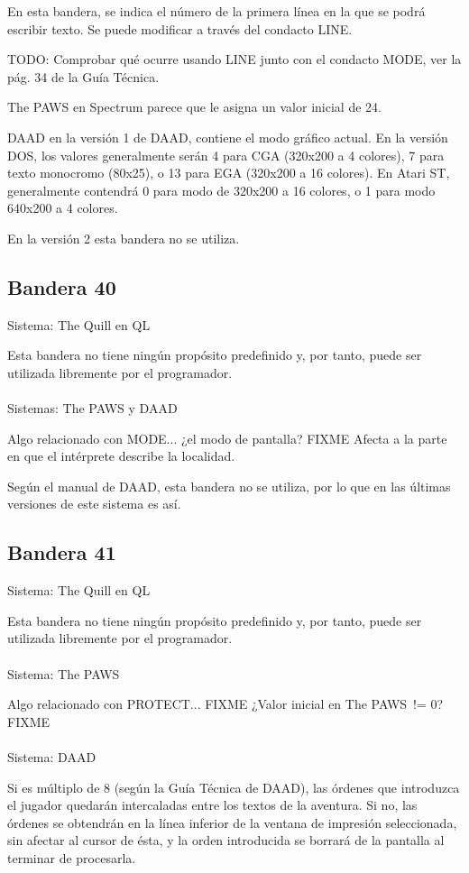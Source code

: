 \documentclass[11pt, a5paper]{article}
\newcommand{\quill}{\textsf{The Quill}\xspace}
\newcommand{\paw}{\textsf{The PAWS}\xspace}
\newcommand{\daad}{\textsf{DAAD}\xspace}
\newcommand{\sistema}[1]{\noindent Sistema: #1 \nopagebreak}
\newcommand{\sistemas}[1]{\noindent Sistemas: #1 \nopagebreak}
\begin{document}
En esta bandera, se indica el número de la primera línea en la que se podrá escribir texto. Se puede modificar a través del condacto LINE.

TODO: Comprobar qué ocurre usando LINE junto con el condacto MODE, ver la pág. 34 de la Guía Técnica.

\paw en Spectrum parece que le asigna un valor inicial de 24.

\daad en la versión 1 de \daad, contiene el modo gráfico actual. En la versión DOS, los valores generalmente serán 4 para CGA (320x200 a 4 colores), 7 para texto monocromo (80x25), o 13 para EGA (320x200 a 16 colores). En Atari ST, generalmente contendrá 0 para modo de 320x200 a 16 colores, o 1 para modo 640x200 a 4 colores.

En la versión 2 esta bandera no se utiliza.

\subsection{Bandera 40}

\sistema{\quill en QL}

Esta bandera no tiene ningún propósito predefinido y, por tanto, puede ser utilizada libremente por el programador.
\\\ \\
\sistemas{\paw y \daad}

Algo relacionado con MODE... ¿el modo de pantalla? FIXME
Afecta a la parte en que el intérprete describe la localidad.

Según el manual de \daad, esta bandera no se utiliza, por lo que en las últimas versiones de este sistema es así.

\subsection{Bandera 41}

\sistema{\quill en QL}

Esta bandera no tiene ningún propósito predefinido y, por tanto, puede ser utilizada libremente por el programador.
\\\ \\
\sistema{\paw}

Algo relacionado con PROTECT... FIXME
¿Valor inicial en \paw\ != 0? FIXME
\\\ \\
\sistema{\daad}

Si es múltiplo de 8 (según la Guía Técnica de \daad \cite[pág. 61]{DAAD}), las órdenes que introduzca el jugador quedarán intercaladas entre los textos de la aventura. Si no, las órdenes se obtendrán en la línea inferior de la ventana de impresión seleccionada, sin afectar al cursor de ésta, y la orden introducida se borrará de la pantalla al terminar de procesarla.
\end{document}
